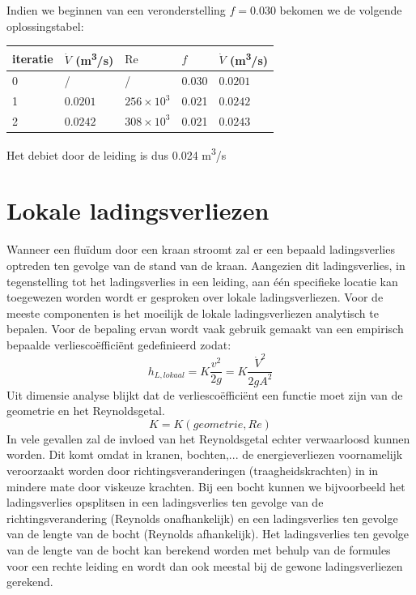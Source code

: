 \begin{voorbeeld}
Indien we beginnen van een veronderstelling $f=0.030$ bekomen we de volgende oplossingstabel:
\begin{center}
	\begin{tabular}{lllll}
		\hline
		iteratie & $\dot{V}$ (\unit{m^3/s}) & $\mathrm{Re}$   & $f$   & $\dot{V}$ (\unit{m^3/s}) \\
		\hline
		0        &  /                       &       /         & 0.030 &  $0.0201$ \\
		1        &  $0.0201$                & $256\times10^3$ & 0.021 &  $0.0242$ \\
		2        &  $0.0242$                & $308\times10^3$ & 0.021 &  $0.0243$ \\
		\hline
	\end{tabular}
\end{center}

Het debiet door de leiding is dus 0.024 \unit{m^3/s}

\end{voorbeeld}


	\section{Lokale ladingsverliezen}
	\label{sec:Lokale ladingsverliezen}
Wanneer een fluïdum door een kraan stroomt zal er een bepaald ladingsverlies optreden ten gevolge van de stand van de kraan. Aangezien dit ladingsverlies, in tegenstelling tot het ladingsverlies in een leiding, aan één specifieke locatie kan toegewezen worden wordt er gesproken over lokale ladingsverliezen. Voor de meeste componenten is het moeilijk de lokale ladingsverliezen analytisch te bepalen. Voor de bepaling ervan wordt vaak gebruik gemaakt van een empirisch bepaalde verliescoëfficiënt gedefinieerd zodat:
\begin{equation}
	h_{L, lokaal} = K \frac{v^2}{2 g} = K \frac{\dot{V}^2}{2 g A^2}
	\label{eqn:lokale ladingsverliezen}
\end{equation}
Uit dimensie analyse blijkt dat de verliescoëfficiënt een functie moet zijn van de geometrie en het Reynoldsgetal.
\begin{equation}
	K = K(geometrie, Re)
\end{equation}
In vele gevallen zal de invloed van het Reynoldsgetal echter verwaarloosd kunnen worden. Dit komt omdat in kranen, bochten,... de energieverliezen voornamelijk veroorzaakt worden door richtingsveranderingen (traagheidskrachten) in in mindere mate door viskeuze krachten. Bij een bocht kunnen we bijvoorbeeld het ladingsverlies opsplitsen in een ladingsverlies ten gevolge van de richtingsverandering (Reynolds onafhankelijk) en een ladingsverlies ten gevolge van de lengte van de bocht (Reynolds afhankelijk). Het ladingsverlies ten gevolge van de lengte van de bocht kan berekend worden met behulp van de formules voor een rechte leiding en wordt dan ook meestal bij de gewone ladingsverliezen gerekend.

